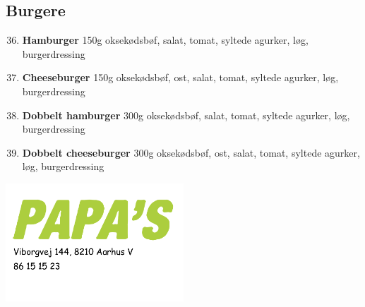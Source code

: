\documentclass[danish,a4paper]{article}
\begin{document}
\begin{multicols}{2}
\subsection*{Burgere}
\begin{enumerate}[label={\large\textbf{\arabic*}.}]
    \setcounter{enumi}{35}
    \item \textbf{Hamburger} 150g oksekødsbøf, salat, tomat, syltede agurker, løg, burgerdressing
    \item \textbf{Cheeseburger}  150g oksekødsbøf, ost, salat, tomat, syltede agurker, løg, burgerdressing
    \item \textbf{Dobbelt hamburger} 300g oksekødsbøf, salat, tomat, syltede agurker, løg, burgerdressing
    \item \textbf{Dobbelt cheeseburger} 300g ok\-se\-køds\-bøf, ost, salat, tomat, syltede agurker, løg, burgerdressing
\end{enumerate}

    \includegraphics[width=0.5\textwidth]{papas.png}

\end{multicols}
\end{document}
